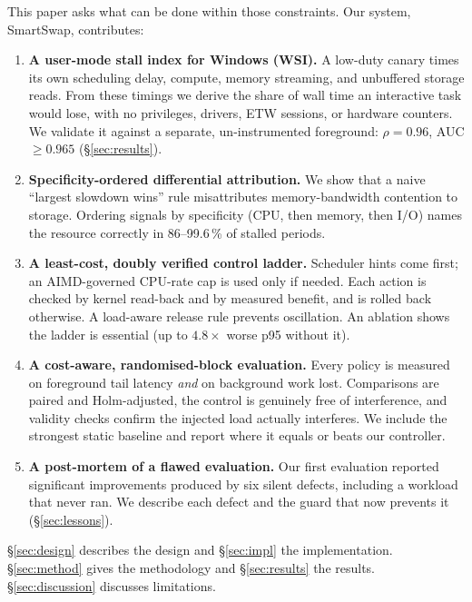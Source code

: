 This paper asks what can be done within those constraints. Our system, SmartSwap, contributes:
\begin{enumerate}
  \item \textbf{A user-mode stall index for Windows (WSI).} A low-duty canary times its own scheduling delay, compute, memory streaming, and unbuffered storage reads. From these timings we derive the share of wall time an interactive task would lose, with no privileges, drivers, ETW sessions, or hardware counters. We validate it against a separate, un-instrumented foreground: $\rho=0.96$, AUC $\geq 0.965$ (\S\ref{sec:results}).
  \item \textbf{Specificity-ordered differential attribution.} We show that a naive ``largest slowdown wins'' rule misattributes memory-bandwidth contention to storage. Ordering signals by specificity (CPU, then memory, then I/O) names the resource correctly in 86--99.6\,\% of stalled periods.
  \item \textbf{A least-cost, doubly verified control ladder.} Scheduler hints come first; an AIMD-governed CPU-rate cap is used only if needed. Each action is checked by kernel read-back and by measured benefit, and is rolled back otherwise. A load-aware release rule prevents oscillation. An ablation shows the ladder is essential (up to $4.8\times$ worse p95 without it).
  \item \textbf{A cost-aware, randomised-block evaluation.} Every policy is measured on foreground tail latency \emph{and} on background work lost. Comparisons are paired and Holm-adjusted, the control is genuinely free of interference, and validity checks confirm the injected load actually interferes. We include the strongest static baseline and report where it equals or beats our controller.
  \item \textbf{A post-mortem of a flawed evaluation.} Our first evaluation reported significant improvements produced by six silent defects, including a workload that never ran. We describe each defect and the guard that now prevents it (\S\ref{sec:lessons}).
\end{enumerate}
\S\ref{sec:design} describes the design and \S\ref{sec:impl} the implementation. \S\ref{sec:method} gives the methodology and \S\ref{sec:results} the results. \S\ref{sec:discussion} discusses limitations.
